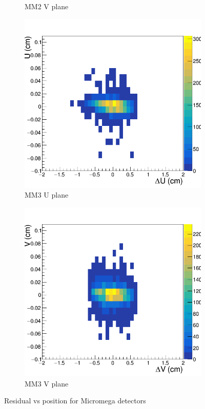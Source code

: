 \begin{figure}[h!]
\begin{subfigure}[r]{.45\textwidth}
   \caption{MM2 V plane}
 \end{subfigure}
 \hfill
 \begin{subfigure}[l]{.45\textwidth}
   \centering
   \includegraphics[width=\linewidth]{thesis_figures/alignment/Run_3211_T/rotMX3U_after_millepede_T.png}
   \caption{MM3 U plane}
 \end{subfigure}
 \begin{subfigure}[r]{.45\textwidth}
   \centering
   \includegraphics[width=\linewidth]{thesis_figures/alignment/Run_3211_T/rotMX3V_after_millepede_T.png}
   \caption{MM3 V plane}
 \end{subfigure}
 \caption{Residual vs position for Micromega detectors}
 \label{fig:res_vs_pos_MX}
\end{figure}

